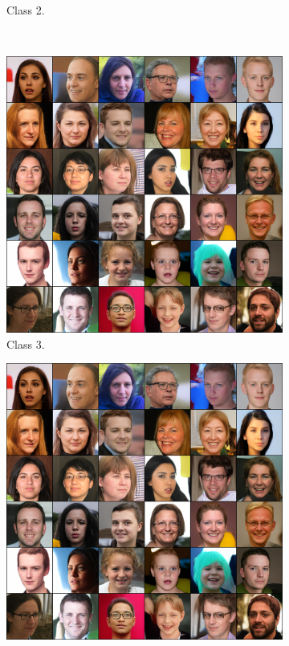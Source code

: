 \begin{figure}[ht]
\begin{subfigure}[b]{0.47\textwidth}
        \caption{
            Class 2.
        }
    \end{subfigure}
    \\
    \begin{subfigure}[b]{0.47\textwidth}
        \centering
        \includegraphics[width=1.0\textwidth]{figures/ffhq256-samples.png}
        \caption{
            Class 3.
        }
    \end{subfigure}
    \hfill
    \begin{subfigure}[b]{0.47\textwidth}
        \centering
        \includegraphics[width=1.0\textwidth]{figures/ffhq256-samples.png}

\end{subfigure}
\end{figure}
